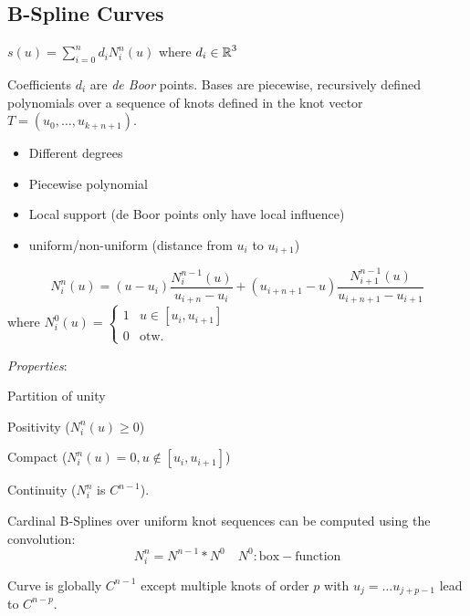 \subsection{B-Spline Curves}

\begin{center}
  \(s(u) = \sum_{i=0}^n d_i N_i^n(u)\) where \(d_i \in \operatorname{\mathbb{R}}^3\)
\end{center}

Coefficients \(d_i\) are \textit{de Boor} points. Bases are piecewise, recursively defined polynomials over a sequence of knots defined in the knot vector \(T = (u_0, \ldots, u_{k+n+1})\).

\begin{itemize}
  \item Different degrees
  \item Piecewise polynomial
  \item Local support (de Boor points only have local influence)
  \item uniform/non-uniform (distance from \(u_i\) to \(u_{i+1}\))
\end{itemize}

\begin{definition}
  \[N_i^n(u) = (u - u_i)\frac{N_i^{n-1}(u)}{u_{i+n} - u_i} + (u_{i+n+1} - u)\frac{N_{i+1}^{n-1}(u)}{u_{i+n+1} - u_{i+1}}\]
  where \(N_i^0(u) = \begin{cases}
    1 & u \in [u_i, u_{i+1}] \\ 0 & \text{otw.}
  \end{cases}\)

  \textit{Properties}:
  \begin{itemize*}
    \item Partition of unity
    \item Positivity (\(N_i^n(u) \geq 0\))
    \item Compact (\(N_i^n(u) = 0, u \notin [u_i, u_{i+1}]\))
    \item Continuity (\(N_i^n\) is \(C^{n-1}\)).
  \end{itemize*}
\end{definition}

\begin{definition}
  Cardinal B-Splines over uniform knot sequences can be computed using the convolution:
  \[N_i^n = N^{n-1} \ast N^0 \quad N^0: \text{box} - \text{function}\]
\end{definition}

\begin{theorem}
  Curve is globally \(C^{n-1}\) except multiple knots of order \(p\) with \(u_j = \ldots u_{j+p-1}\) lead to \(C^{n-p}\).
\end{theorem}

